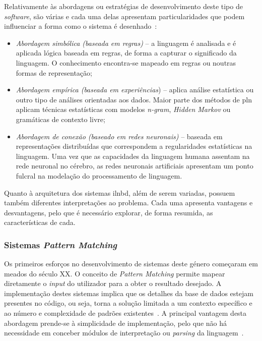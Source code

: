 Relativamente às abordagens ou estratégias de desenvolvimento deste tipo de \textit{software}, são várias e cada uma delas apresentam particularidades que podem influenciar a forma como o sistema é desenhado~\parencite{nlidb_brief_review, survey_nlidb}:

\begin{itemize}
    \item 
    {
        \textit{Abordagem simbólica (baseada em regras)} -- a linguagem é analisada e é aplicada lógica baseada em regras, de forma a capturar o significado da linguagem. O conhecimento encontra-se mapeado em regras ou noutras formas de representação;
    }
    \item
    {
        \textit{Abordagem empírica (baseada em experiências}) -- aplica análise estatística ou outro tipo de análises orientadas aos dados. Maior parte dos métodos de \gls{pln} aplicam técnicas estatísticas com modelos \textit{n-gram}, \textit{Hidden Markov} ou gramáticas de contexto livre;
    }
    \item
    {
        \textit{Abordagem de conexão (baseado em redes neuronais)} -- baseada em representações distribuídas que correspondem a regularidades estatísticas na linguagem. Uma vez que as capacidades da linguagem humana assentam na rede neuronal no cérebro, as redes neuronais artificiais apresentam um ponto fulcral na modelação do processamento de linguagem.
    }
\end{itemize}

Quanto à arquitetura dos sistemas \gls{ilnbd}, além de serem variadas, possuem também diferentes interpretações ao problema. Cada uma apresenta vantagens e desvantagens, pelo que é necessário explorar, de forma resumida, as características de cada.

\subsubsection{Sistemas \textit{Pattern Matching}}
Os primeiros esforços no desenvolvimento de sistemas deste género começaram em meados do século XX. O conceito de \textit{Pattern Matching} permite mapear diretamente o \textit{input} do utilizador para a obter o resultado desejado. A implementação destes sistemas implica que os detalhes da base de dados estejam presentes no código, ou seja, torna a solução limitada a um contexto específico e ao número e complexidade de padrões existentes~\parencite{nlidb_brief_review}. A principal vantagem desta abordagem prende-se à simplicidade de implementação, pelo que não há necessidade em conceber módulos de interpretação ou \textit{parsing} da linguagem~\parencite{nlidb_brief_review, survey_nlidb}.

